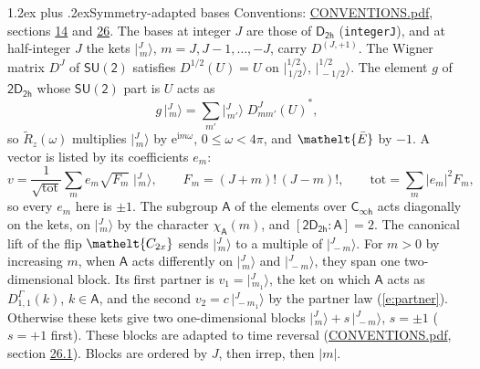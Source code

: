 \documentclass[10pt,a4paper]{article}
\makeatletter
\renewcommand\section{\@startsection{section}{1}{\z@}{-3ex plus -1ex minus -.2ex}%
  {1.2ex plus .2ex}{\normalfont\large\sffamily\bfseries\color{parttitle}}}
\numberwithin{equation}{section}
\newcommand{\eltfont}[1]{{\let\sigma\eltsigma\mathelt{#1}}}
\newcommand{\grp}[1]{\mathsf{#1}}
\newcommand{\elt}[1]{\eltfont{#1}}
\newcommand{\grpindex}[2]{[#1 : #2]}
\newcommand{\iunit}{\mathrm{i}}
\newcommand{\expe}{\mathrm{e}}
\newcommand{\irrJp}[2]{D^{(#1,#2)}}
\newcommand{\repD}[1]{D^{#1}}
\newcommand{\wignerD}[1]{D^{#1}}
\newcommand{\chiA}{\chi_{\grp{A}}}
\newcommand{\conj}[1]{{#1}^{*}}
\newcommand{\jm}[2]{\bigl\lvert{}^{#1}_{\,#2}\bigr\rangle}
\newcommand{\barred}[1]{\bar{#1}}
\newcommand{\lift}[1]{\tilde{#1}}
\makeatother
\begin{document}
\section{Symmetry-adapted bases}\label{s:bases}
Conventions: \href{../../CONVENTIONS.pdf}{CONVENTIONS.pdf}, sections \href{../../../rotation/CONVENTIONS.pdf\#conv.14}{14} and \href{../../CONVENTIONS.pdf\#conv.26}{26}.
\leavevmode\label{n:index.m}\label{n:vector.ket}The bases at integer $J$ are those of \href{../../../rotation/data/pdf/D2h.pdf}{$\grp{D_{2h}}$} (\texttt{integerJ}), and at half-integer $J$ the kets $\jm{J}{m}$, $m = J, J-1, \dots, -J$, carry $\irrJp{J}{+1}$. \label{n:matrix.wigner}The Wigner matrix $\wignerD{J}$ of $\grp{SU(2)}$ satisfies $\wignerD{1/2}(U) = U$ on $\jm{1/2}{1/2}$, $\jm{1/2}{-1/2}$. The element $g$ of $\grp{2D_{2h}}$ whose $\grp{SU(2)}$ part is $U$ acts as
\begin{equation}\label{e:action}g\,\jm{J}{m} = \sum_{m'} \jm{J}{m'}\; \conj{\wignerD{J}_{m m'}(U)},\end{equation}
so $\lift{R}_{z}(\omega)$ multiplies $\jm{J}{m}$ by $\expe^{\iunit m\omega}$, $0 \le \omega < 4\pi$, and $\elt{\barred{E}}$ by $-1$. \label{n:index.ketcoefficient}\label{n:vector.basis.symmetry}\label{n:index.ketweight}\label{n:index.total}A vector is listed by its coefficients $e_m$:
\begin{equation}\label{e:ket}v = \frac{1}{\sqrt{\mathrm{tot}}}\sum_m e_m\sqrt{F_m}\;\jm{J}{m},\qquad F_m = (J+m)!\,(J-m)!,\qquad \mathrm{tot} = \sum_m |e_m|^2F_m,\end{equation}
so every $e_m$ here is $\pm 1$.
\leavevmode\label{n:group.A}\label{n:function.character.abelian}The subgroup $\grp{A}$ of the elements over $\grp{C_{\infty h}}$ acts diagonally on the kets, on $\jm{J}{m}$ by the character $\chiA(m)$, and $\grpindex{\grp{2D_{2h}}}{\grp{A}} = 2$. The canonical lift of the flip $\elt{C_{2x}}$ sends $\jm{J}{m}$ to a multiple of $\jm{J}{-m}$. For $m > 0$ by increasing $m$, when $\grp{A}$ acts differently on $\jm{J}{m}$ and $\jm{J}{-m}$, they span one two-dimensional block. \label{n:index.partner.sign}Its first partner is $v_1 = \jm{J}{m_1}$, the ket on which $\grp{A}$ acts as $\repD{\Gamma}_{1,1}(k)$, $k \in \grp{A}$, and the second $v_2 = c\,\jm{J}{-m_1}$ by the partner law (\ref{e:partner}). \label{n:index.pair.sign}Otherwise these kets give two one-dimensional blocks $\jm{J}{m} + s\,\jm{J}{-m}$, $s = \pm 1$ ($s = +1$ first). These blocks are adapted to time reversal (\href{../../CONVENTIONS.pdf}{CONVENTIONS.pdf}, section \href{../../CONVENTIONS.pdf\#conv.26.1}{26.1}). Blocks are ordered by $J$, then irrep, then $|m|$.
\end{document}
